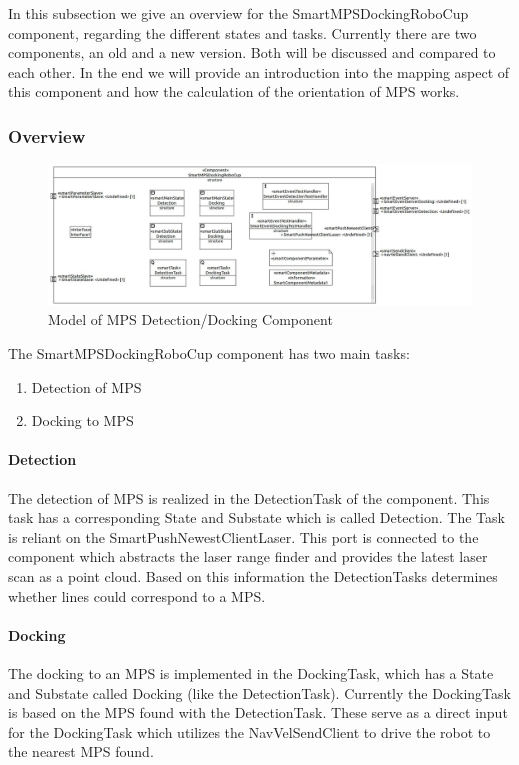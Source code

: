 In this subsection we give an overview for the SmartMPSDockingRoboCup component, regarding the different states and tasks. Currently there are two components, an old and a new version. Both will be discussed and compared to each other. In the end we will provide an introduction into the mapping aspect of this component and how the calculation of the orientation of MPS works.

\subsubsection{Overview}

\begin{figure}[h]
\centering
\includegraphics[scale=0.4]{pic/SmartMPSDockingRoboCup.JPG}
\caption{Model of MPS Detection/Docking Component}
\label{fig:i_overview}
\end{figure}

The SmartMPSDockingRoboCup component has two main tasks:

\begin{enumerate}
\item Detection of MPS
\item Docking to MPS
\end{enumerate}

\paragraph{Detection}
The detection of MPS is realized in the DetectionTask of the component. This task has a corresponding State and Substate which is called Detection. The Task is reliant on the SmartPushNewestClientLaser. This port is connected to the component which abstracts the laser range finder and provides the latest laser scan as a point cloud. Based on this information the DetectionTasks determines whether lines could correspond to a MPS. \\


\paragraph{Docking}
The docking to an MPS is implemented in the DockingTask, which has a State and Substate called Docking (like the DetectionTask). Currently the DockingTask is based on the MPS found with the DetectionTask. These serve as a direct input for the DockingTask which utilizes the NavVelSendClient to drive the robot to the nearest MPS found.

